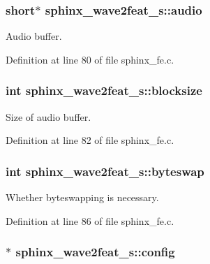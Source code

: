 \subsubsection[{audio}]{\setlength{\rightskip}{0pt plus 5cm}short$\ast$ sphinx\+\_\+wave2feat\+\_\+s\+::audio}\label{structsphinx__wave2feat__s_a776c72734abe1e34162a5ee347f533e5}


Audio buffer. 



Definition at line 80 of file sphinx\+\_\+fe.\+c.

\subsubsection[{blocksize}]{\setlength{\rightskip}{0pt plus 5cm}int sphinx\+\_\+wave2feat\+\_\+s\+::blocksize}\label{structsphinx__wave2feat__s_aff2646e41780ceb9dcd234c719fd25f1}


Size of audio buffer. 



Definition at line 82 of file sphinx\+\_\+fe.\+c.

\subsubsection[{byteswap}]{\setlength{\rightskip}{0pt plus 5cm}int sphinx\+\_\+wave2feat\+\_\+s\+::byteswap}\label{structsphinx__wave2feat__s_a030717e2736fd04d1a281f51e5db2799}


Whether byteswapping is necessary. 



Definition at line 86 of file sphinx\+\_\+fe.\+c.

\subsubsection[{config}]{$\ast$ sphinx\+\_\+wave2feat\+\_\+s\+::config}\label{structsphinx__wave2feat__s_a484d308befbde315664da8520ebc410d}


